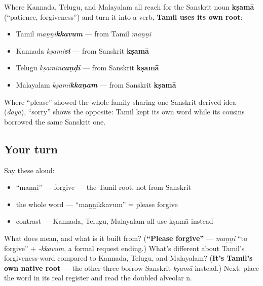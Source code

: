 \begin{cousinweb}
Where Kannada, Telugu, and Malayalam all reach for the Sanskrit noun \textbf{kṣamā} (\textquotedblleft{}patience, forgiveness\textquotedblright{}) and turn it into a verb, \textbf{Tamil uses its own root}:

\begin{itemize}
\raggedright
  \item Tamil \textbf{} \emph{maṉṉi\textbf{kkavum}} — from Tamil \textbf{} \emph{maṉṉi}
  \item Kannada \textbf{} \emph{kṣami\textbf{si}} — from Sanskrit \textbf{kṣamā}
  \item Telugu \textbf{} \emph{kṣamin̄\textbf{caṇḍi}} — from Sanskrit \textbf{kṣamā}
  \item Malayalam \textbf{} \emph{kṣami\textbf{kkaṇam}} — from Sanskrit \textbf{kṣamā}
\end{itemize}

Where \textquotedblleft{}please\textquotedblright{} showed the whole family sharing one Sanskrit-derived idea (\emph{daya}), \textquotedblleft{}sorry\textquotedblright{} shows the opposite: Tamil kept its own word while its cousins borrowed the same Sanskrit one.
\end{cousinweb}

\subsection*{Your turn}
Say these aloud:

\begin{itemize}
\raggedright
  \item \textquotedblleft{}maṉṉi\textquotedblright{} — forgive — the Tamil root, not from Sanskrit
  \item the whole word — \textquotedblleft{}maṉṉikkavum\textquotedblright{} = please forgive
  \item contrast — Kannada, Telugu, Malayalam all use kṣamā instead
\end{itemize}

\begin{tcolorbox}[breakable,colback=teal!4,colframe=teal!35!black,title={Before you move on}]
What does \textbf{} mean, and what is it built from? (\textbf{\textquotedblleft{}Please forgive\textquotedblright{}} — \emph{maṉṉi} \textquotedblleft{}to forgive\textquotedblright{} + \emph{‑kkavum}, a formal request ending.) What's different about Tamil's forgiveness-word compared to Kannada, Telugu, and Malayalam? (\textbf{It's Tamil's own native root} — the other three borrow Sanskrit \emph{kṣamā} instead.) Next: place the word in its real register and read the doubled alveolar n.
\end{tcolorbox}
